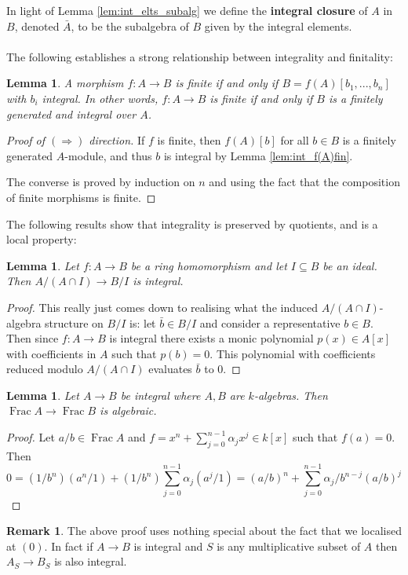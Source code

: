 \documentclass[12pt]{article}
\theoremstyle{plain}
\newtheorem{lemma}[thm]{Lemma}
\theoremstyle{definition}
\newtheorem{remark}[thm]{Remark}
\newcommand{\lto}{\longrightarrow}
\begin{document}
In light of Lemma \ref{lem:int_elts_subalg} we define the \textbf{integral closure} of $A$ in $B$, denoted $\bar{A}$, to be the subalgebra of $B$ given by the integral elements.\\\\
%
The following establishes a strong relationship between integrality and finitality:
\begin{lemma}\label{lem:finite_integral}
A morphism $f: A \to B$ is finite if and only if $B = f(A)[b_1,...,b_n]$ with $b_i$ integral. In other words, $f: A \to B$ is finite if and only if $B$ is a finitely generated and integral over $A$.
\end{lemma}
\begin{proof}[Proof of $(\Rightarrow)$ direction]
If $f$ is finite, then $f(A)[b]$ for all $b \in B$ is a finitely generated $A$-module, and thus $b$ is integral by Lemma \ref{lem:int_f(A)fin}.

The converse is proved by induction on $n$ and using the fact that the composition of finite morphisms is finite.
\end{proof}
The following results show that integrality is preserved by quotients, and is a local property:
\begin{lemma}
\label{lem:quotient_integrality}
Let $f: A \lto B$ be a ring homomorphism and let $I \subseteq B$ be an ideal. Then $A/(A \cap I) \lto B/I$ is integral.
\end{lemma}
\begin{proof}
This really just comes down to realising what the induced $A/(A \cap I)$-algebra structure on $B/I$ is: let $\bar{b} \in B/I$ and consider a representative $b \in B$. Then since $f:A \lto B$ is integral there exists a monic polynomial $p(x) \in A[x]$ with coefficients in $A$ such that $p(b) = 0$. This polynomial with coefficients reduced modulo $A/(A \cap I)$ evaluates $\bar{b}$ to 0.
\end{proof}
\begin{lemma}
\label{lem:int_implies_alg} Let $A \lto B$ be integral where $A,B$ are $k$-algebras. Then $\operatorname{Frac}A \lto \operatorname{Frac}B$ is algebraic.
\end{lemma}
\begin{proof}
Let $a/b \in \operatorname{Frac}A$ and $f = x^n + \sum_{j = 0}^{n-1}\alpha_j x^j \in k[x]$ such that $f(a) = 0$. Then
\[0 = (1/b^n)(a^n/1) + (1/b^n)\sum_{j = 0}^{n-1}\alpha_j(a^j/1) = (a/b)^n + \sum_{j = 0}^{n-1}\alpha_j/b^{n-j} (a/b)^j\]
\end{proof}
\begin{remark}
The above proof uses nothing special about the fact that we localised at $(0)$. In fact if $A \lto B$ is integral and $S$ is any multiplicative subset of $A$ then $A_S \lto B_S$ is also integral.
\end{remark}
%
\end{document}
